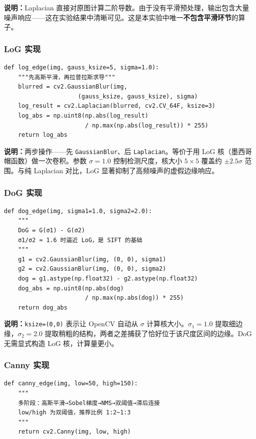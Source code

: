 \documentclass[12pt,a4paper]{ctexart}
\begin{document}
\textbf{说明：}Laplacian 直接对原图计算二阶导数。由于没有平滑预处理，输出包含大量噪声响应——这在实验结果中清晰可见。这是本实验中唯一\textbf{不包含平滑环节}的算子。

\subsubsection*{LoG 实现}

\begin{lstlisting}[caption={LoG（高斯拉普拉斯）}, label=lst:log]
def log_edge(img, gauss_ksize=5, sigma=1.0):
    """先高斯平滑，再拉普拉斯求导"""
    blurred = cv2.GaussianBlur(img,
                     (gauss_ksize, gauss_ksize), sigma)
    log_result = cv2.Laplacian(blurred, cv2.CV_64F, ksize=3)
    log_abs = np.uint8(np.abs(log_result)
                       / np.max(np.abs(log_result)) * 255)
    return log_abs
\end{lstlisting}

\textbf{说明：}两步操作——先 \texttt{GaussianBlur}、后 \texttt{Laplacian}。等价于用 LoG 核（墨西哥帽函数）做一次卷积。参数 $\sigma=1.0$ 控制检测尺度，核大小 $5\times5$ 覆盖约 $\pm2.5\sigma$ 范围。与纯 Laplacian 对比，LoG 显著抑制了高频噪声的虚假边缘响应。

\subsubsection*{DoG 实现}

\begin{lstlisting}[caption={DoG（高斯差分）}, label=lst:dog]
def dog_edge(img, sigma1=1.0, sigma2=2.0):
    """
    DoG = G(σ1) - G(σ2)
    σ1/σ2 ≈ 1.6 时逼近 LoG，是 SIFT 的基础
    """
    g1 = cv2.GaussianBlur(img, (0, 0), sigma1)
    g2 = cv2.GaussianBlur(img, (0, 0), sigma2)
    dog = g1.astype(np.float32) - g2.astype(np.float32)
    dog_abs = np.uint8(np.abs(dog)
                       / np.max(np.abs(dog)) * 255)
    return dog_abs
\end{lstlisting}

\textbf{说明：}\texttt{ksize=(0,0)} 表示让 OpenCV 自动从 $\sigma$ 计算核大小。$\sigma_1=1.0$ 提取细边缘，$\sigma_2=2.0$ 提取稍粗的结构，两者之差捕获了恰好位于该尺度区间的边缘。DoG 无需显式构造 LoG 核，计算量更小。

\subsubsection*{Canny 实现}

\begin{lstlisting}[caption={Canny算子}, label=lst:canny]
def canny_edge(img, low=50, high=150):
    """
    多阶段：高斯平滑→Sobel梯度→NMS→双阈值→滞后连接
    low/high 为双阈值，推荐比例 1:2~1:3
    """
    return cv2.Canny(img, low, high)
\end{lstlisting}
\end{document}
